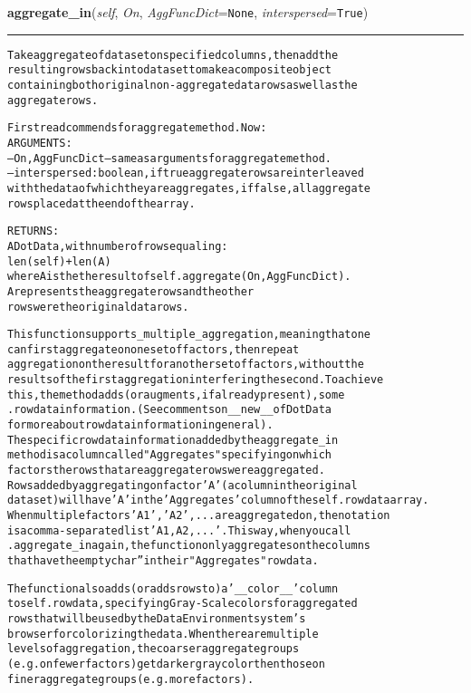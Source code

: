 \hspace{.8\funcindent}\begin{boxedminipage}{\funcwidth}

    \raggedright \textbf{aggregate\_in}(\textit{self}, \textit{On}, \textit{AggFuncDict}={\tt None}, \textit{interspersed}={\tt True})

    \vspace{-1.5ex}

    \rule{\textwidth}{0.5\fboxrule}
\setlength{\parskip}{2ex}
\begin{alltt}

Take aggregate of data set on specified columns, then add the 
resulting rows back into data set to make a composite object 
containing both original non-aggregate data rows as well as the 
aggregate rows. 

First read commends for aggregate method.  Now:
ARGUMENTS:
--On, AggFuncDict -- same as arguments for aggregate method. 
-- interspersed : boolean, if true aggregate rows are interleaved 
with the data of which they are aggregates, if false, all aggregate 
rows placed at the end of the array. 

RETURNS:
A DotData, with number of rows equaling:
                len(self) + len(A)
where A is the the result of self.aggregate(On,AggFuncDict).
A represents the aggregate rows and the other 
rows were the original data rows. 
                
This function supports \_multiple\_ aggregation, meaning that one
can first aggregate on one set of factors, then repeat
aggregation on the result for another set of factors, without the
results of the first aggregation interfering the second.  To achieve 
this, the method adds (or augments, if already present), some
.rowdata information.  (See comments on \_\_new\_\_ of DotData 
for more about rowdata information in general).     
The specific rowdata information added by the aggregate\_in 
method is a column called "Aggregates" specifying on which 
factors the rows that are aggregate rows were aggregated.  
Rows added by aggregating on factor 'A' (a column in the original 
data set) will have 'A' in the 'Aggregates' column of the self.rowdata array.  
When multiple factors 'A1', 'A2' , ... are aggregated on, the notation
is a comma-separated list 'A1,A2,...'.    This way, when you call
.aggregate\_in again, the function only aggregates on the columns 
that have the empty char '' in their "Aggregates" rowdata.   

The function also adds (or adds rows to) a '\_\_color\_\_' column 
to self.rowdata, specifying Gray-Scale colors for aggregated
rows that will be used by the Data Environment system's 
browser for colorizing the  data.   When there are multiple
levels of aggregation, the coarser aggregate groups 
(e.g. on fewer factors) get darker gray color then those on
finer aggregate groups (e.g. more factors).  
\end{alltt}

\setlength{\parskip}{1ex}
    \end{boxedminipage}

